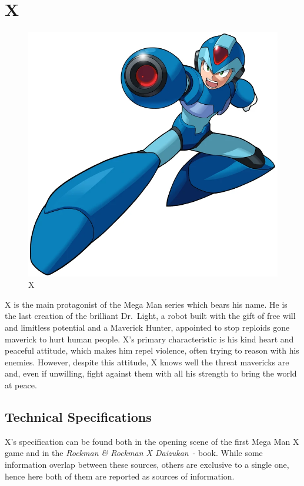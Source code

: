 \chapter{X}\label{char:X}
\begin{figure}[h]
	\centering
	\includegraphics[height=\BIGportraitsize]{figures/Characters/Char_MMX.png}
	\caption{X}
\end{figure}

X is the main protagonist of the Mega Man series which bears his name. He is the last creation of the brilliant Dr.~Light, a robot built with the gift of free will and limitless potential and a Maverick Hunter, appointed to stop reploids gone maverick to hurt human people. 
X's primary characteristic is his kind heart and peaceful attitude, which makes him repel violence, often trying to reason with his enemies. However, despite this attitude, X knows well the threat mavericks are and, even if unwilling, fight against them with all his strength to bring the world at peace.

\section{Technical Specifications}
X's specification can be found both in the opening scene of the first Mega Man X game and in the \emph{Rockman \& Rockman X Daizukan}~\cite{book:RRXD}-\cite{X_specs_translated} book. While some information overlap between these sources, others are exclusive to a single one, hence here both of them are reported as sources of information.

